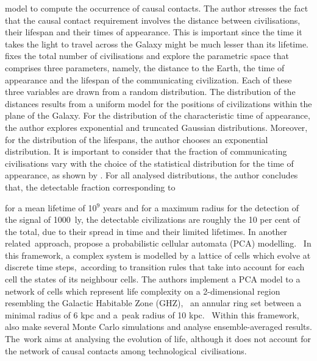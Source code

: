 \documentclass[crop]{CSLB}
\begin{document}
model to compute the occurrence of causal contacts.
%
The author stresses the fact that the causal contact requirement
involves the distance between civilisations, their lifespan and their
times of appearance.
%
This is important since the time it takes the
light to travel across the Galaxy might be much lesser than its lifetime.
%
\citet{balbi_impact_2018} fixes the total number of civilisations and
explore the parametric space that comprises three parameters, namely,
the distance to the Earth, the time of appearance and the lifespan of
the communicating civilization.
%
Each of these three variables are drawn from a random distribution.
%
The distribution of the distances results from a uniform model for the
positions of civilizations within the plane of the Galaxy.
%
For the distribution of the characteristic time of appearance, the
author explores exponential and truncated Gaussian distributions.
%
Moreover, for the distribution of the lifespans, the author chooses an
exponential distribution.
%
It is important to consider that the fraction of communicating
civilisations vary with the choice of the statistical distribution for
the time of appearance, as shown by \citet{balbi_impact_2018}.
%
For all analysed distributions, the author concludes that,
the detectable fraction corresponding to 

for a mean
lifetime of 10$^9$ years and for a maximum radius for the detection of
the signal of 1000~ly, the detectable civilizations
are roughly the 10 per cent of the total, due to their spread in time and
their limited lifetimes.
%
In another related approach, \citet{vukotic_astrobiological_2012}
propose a probabilistic cellular automata (PCA) modelling. 
%
In this framework, a complex system is modelled by a lattice of cells
which evolve at discrete time steps, according to transition rules
that take into account for each cell the states of its neighbour
cells.
%
The authors implement a PCA model to a network of cells which
represent life complexity on a 2-dimensional region resembling the
Galactic Habitable Zone (GHZ),  an annular ring set between a minimal
radius of 6 kpc and a peak radius of 10 kpc. 
%
Within this framework, \citet{vukotic_astrobiological_2012} also make
several Monte Carlo simulations and analyse ensemble-averaged results.
%
The work aims at analysing the evolution of life, although it does not
account for the network of causal contacts among
technological civilisations.

\end{document}
